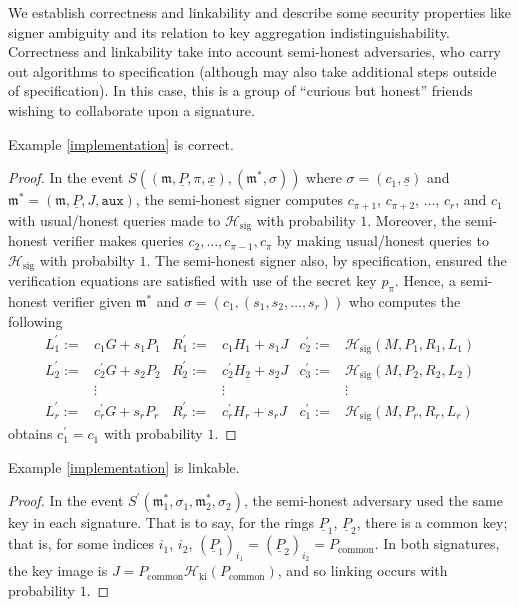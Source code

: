 \documentclass{iacrtrans}
\theoremstyle{definition}
\numberwithin{theorem}{subsection}
\numberwithin{lemma}{theorem}
\begin{document}
We establish correctness and linkability and describe some security properties like signer ambiguity and its relation to key aggregation indistinguishability. Correctness and linkability take into account semi-honest adversaries, who carry out algorithms to specification (although may also take additional steps outside of specification). In this case, this is a group of ``curious but honest'' friends wishing to collaborate upon a signature.

\begin{lemma}\label{correctness}
Example \ref{implementation} is correct.
\end{lemma}
\begin{proof}

In the event $S((\mathfrak{m}, \underline{P}, \pi, \underline{x}), (\mathfrak{m}^*, \sigma))$ where $\sigma = (c_1, \underline{s})$ and $\mathfrak{m}^* = (\mathfrak{m}, \underline{P}, J, \texttt{aux})$, the semi-honest signer computes $c_{\pi+1}$, $c_{\pi+2}$, $\ldots$, $c_r$, and $c_1$ with usual/honest queries made to $\mathcal{H}_{\text{sig}}$ with probability $1$. Moreover, the semi-honest verifier makes queries $c_2, \ldots, c_{\pi-1}, c_\pi$ by making usual/honest queries to $\mathcal{H}_{\text{sig}}$ with probabilty $1$. The semi-honest signer also, by specification, ensured the verification equations are satisfied with use of the secret key $p_\pi$. Hence, a semi-honest verifier given $\mathfrak{m}^*$ and $\sigma = (c_1, (s_1, s_2, \ldots, s_r))$ who computes the following
\begin{align*}
L_1^\prime :=& c_1 G + s_1 P_1 & R_1^\prime :=& c_1 H_1 + s_1 J & c_2^\prime :=& \mathcal{H}_{\text{sig}}(M, P_1, R_1, L_1) \\
L_2^\prime :=& c_2^\prime G + s_2 P_2 & R_2^\prime :=& c_2^\prime H_2 + s_2 J & c_3^\prime :=& \mathcal{H}_{\text{sig}}(M, P_2, R_2, L_2) \\
 & \vdots & & \vdots & & \vdots \\
L_r^\prime :=& c_r^\prime G + s_r P_r & R_r^\prime :=& c_r^\prime H_r + s_r J & c_1^\prime :=& \mathcal{H}_{\text{sig}}(M, P_r, R_r, L_r)
\end{align*} obtains $c_1^\prime = c_1$ with probability $1$.
\end{proof}


\begin{lemma}
Example \ref{implementation} is linkable.
\end{lemma}
\begin{proof}
In the event $S^\prime(\mathfrak{m}_1^*, \sigma_1, \mathfrak{m}^*_2, \sigma_2)$, the semi-honest adversary used the same key in each signature. That is to say, for the rings $\underline{P}_1$, $\underline{P}_2$, there is a common key; that is, for some indices $i_1$, $i_2$, $(\underline{P}_1)_{i_1} = (\underline{P}_2)_{i_2} = P_{\text{common}}$. In both signatures, the key image is $J = P_{\text{common}}\mathcal{H}_{\text{ki}}(P_{\text{common}})$, and so linking occurs with probability $1$.
\end{proof}
\end{document}
